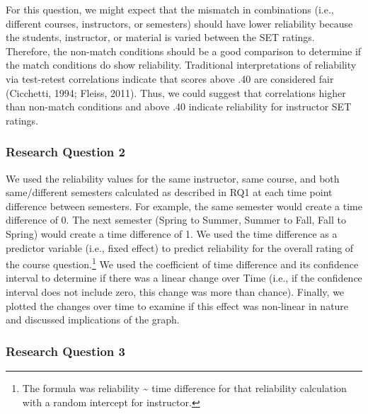 \documentclass[
  man]{apa7}
\begin{document}
For this question, we might expect that the mismatch in combinations
(i.e., different courses, instructors, or semesters) should have lower
reliability because the students, instructor, or material is varied
between the SET ratings. Therefore, the non-match conditions should be a
good comparison to determine if the match conditions do show
reliability. Traditional interpretations of reliability via test-retest
correlations indicate that scores above .40 are considered fair
(Cicchetti, 1994; Fleiss, 2011). Thus, we could suggest that correlations
higher than non-match conditions and above .40 indicate reliability for
instructor SET ratings.

\subsubsection{Research Question 2}\label{research-question-2}

We used the reliability values for the same instructor, same course, and
both same/different semesters calculated as described in RQ1 at each
time point difference between semesters. For example, the same semester
would create a time difference of 0. The next semester (Spring to
Summer, Summer to Fall, Fall to Spring) would create a time difference
of 1. We used the time difference as a predictor variable (i.e., fixed
effect) to predict reliability for the overall rating of the course
question.\footnote{The formula was reliability \textasciitilde{} time difference for that
  reliability calculation with a random intercept for instructor.} We
used the coefficient of time difference and its confidence interval to
determine if there was a linear change over Time (i.e., if the
confidence interval does not include zero, this change was more than
chance). Finally, we plotted the changes over time to examine if this
effect was non-linear in nature and discussed implications of the graph.

\subsubsection{Research Question 3}\label{research-question-3}
\end{document}
